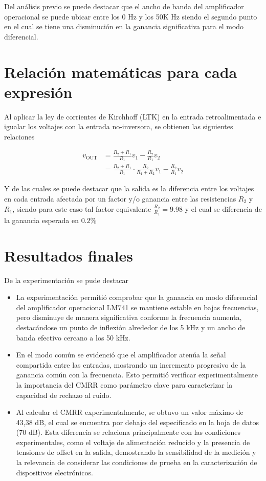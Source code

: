 Del análisis previo se puede destacar que el ancho de banda del amplificador operacional se puede ubicar entre los 0 Hz y los 50K Hz siendo el segundo punto en el cual se tiene una disminución en la ganancia significativa para el modo diferencial.

\section{Relación matemáticas para cada expresión}

Al aplicar la ley de corrientes de Kirchhoff (LTK) en la entrada retroalimentada e igualar los voltajes con la entrada no-inversora, se obtienen las siguientes relaciones 

\begin{align}
	v_{\text{OUT}} &= \frac{R_2 + R_1}{R_1} v_1 - \frac{R_2}{R_1} v_2 \\[6pt]
	&= \frac{R_2 + R_1}{R_1} \cdot \frac{R_2}{R_1 + R_2} v_1 - \frac{R_2}{R_1} v_2
\end{align}

Y de las cuales se puede destacar que la salida es la diferencia entre los voltajes en cada entrada afectada por un factor y/o ganancia entre las resistencias $R_2$ y $R_1$, siendo para este caso tal factor equivalente $ \frac{R_2}{R_1} = 9.98$ y el cual se diferencia de la ganancia esperada en $0.2 \%$


\section*{Resultados finales}

De la experimentación se pude destacar 
\begin{itemize}
	\item La experimentación permitió comprobar que la ganancia en modo diferencial del amplificador operacional LM741 se mantiene estable en bajas frecuencias, pero disminuye de manera significativa conforme la frecuencia aumenta, destacándose un punto de inflexión alrededor de los 5 kHz y un ancho de banda efectivo cercano a los 50 kHz.
	
	\item En el modo común se evidenció que el amplificador atenúa la señal compartida entre las entradas, mostrando un incremento progresivo de la ganancia común con la frecuencia. Esto permitió verificar experimentalmente la importancia del CMRR como parámetro clave para caracterizar la capacidad de rechazo al ruido.
	
	\item Al calcular el CMRR experimentalmente, se obtuvo un valor máximo de 43,38 dB, el cual se encuentra por debajo del especificado en la hoja de datos (70 dB). Esta diferencia se relaciona principalmente con las condiciones experimentales, como el voltaje de alimentación reducido y la presencia de tensiones de offset en la salida, demostrando la sensibilidad de la medición y la relevancia de considerar las condiciones de prueba en la caracterización de dispositivos electrónicos.
\end{itemize}


